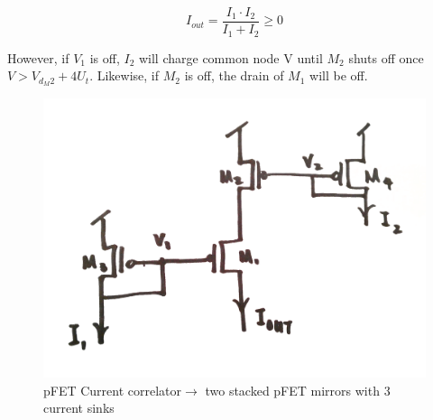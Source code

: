 \documentclass[main]{subfiles}
\begin{document}
\begin{equation}
I_{out} = \frac{I_1 \cdot I_2}{I_1+I_2} \geq 0
\end{equation}

However, if $V_1$ is off, $I_2$ will charge common node V until $M_2$ shuts off once $V>V_{d_M2}+4U_t$. Likewise, if $M_2$ is off, the drain of $M_1$ will be off. 

\begin{figure}[htbp]
  \centering
  \includegraphics[scale=0.2]{figs/pFET_Current_correlator_circuit.png}
  \caption{pFET Current correlator$ \rightarrow$ two stacked pFET mirrors with 3 current sinks}
  \label{fig:pFET_Current_correlator_circuit}
\end{figure}
\end{document}
